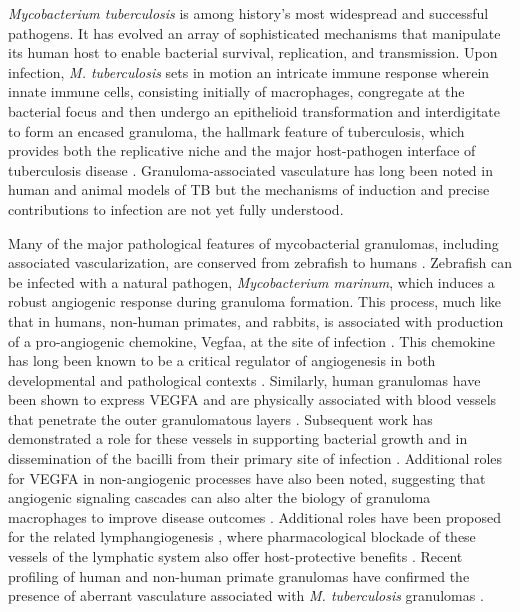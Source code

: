 \textit{Mycobacterium tuberculosis} is among history's most widespread and successful pathogens. It has evolved an array of sophisticated mechanisms that manipulate its human host to enable bacterial survival, replication, and transmission. Upon infection, \textit{M. tuberculosis} sets in motion an intricate immune response wherein innate immune cells, consisting initially of macrophages, congregate at the bacterial focus and then undergo an epithelioid transformation and interdigitate to form an encased granuloma, the hallmark feature of tuberculosis, which provides both the replicative niche and the major host-pathogen interface of tuberculosis disease \citep{Cronan2016, Pagan2018, Cronan2021}. Granuloma-associated vasculature has long been noted in human and animal models of TB \citep{Cudkowicz1952, Russell2010} but the mechanisms of induction and precise contributions to infection are not yet fully understood.

Many of the major pathological features of mycobacterial granulomas, including associated vascularization, are conserved from zebrafish to humans \citep{Swaim2006, Bohrer2021}. Zebrafish can be infected with a natural pathogen, \textit{Mycobacterium marinum}, which induces a robust angiogenic response during granuloma formation. This process, much like that in humans, non-human primates, and rabbits, is associated with production of a pro-angiogenic chemokine, Vegfaa, at the site of infection \citep{Oehlers2015}. This chemokine has long been known to be a critical regulator of angiogenesis in both developmental and pathological contexts \citep{Chung2011, Leung1989, Adams2007}. Similarly, human granulomas have been shown to express VEGFA and are physically associated with blood vessels that penetrate the outer granulomatous layers \citep{Datta2015}. Subsequent work has demonstrated a role for these vessels in supporting bacterial growth and in dissemination of the bacilli from their primary site of infection \citep{Polena2016}. Additional roles for VEGFA in non-angiogenic processes have also been noted, suggesting that angiogenic signaling cascades can also alter the biology of granuloma macrophages to improve disease outcomes \citep{Harding2019}. Additional roles have been proposed for the related lymphangiogenesis \citep{Alitalo2005, Duong2012, Lerner2020}, where pharmacological blockade of these vessels of the lymphatic system also offer host-protective benefits \citep{Harding2015}. Recent profiling of human and non-human primate granulomas have confirmed the presence of aberrant vasculature associated with \textit{M. tuberculosis} granulomas \citep{Gideon2022, McCaffrey2022, Cronan2021}.

